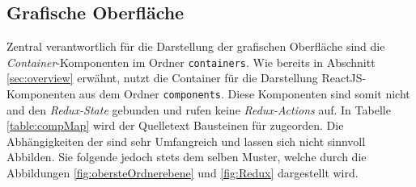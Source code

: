 \subsection{Grafische Oberfläche}

Zentral verantwortlich für die Darstellung der grafischen Oberfläche sind die \emph{Container}-Komponenten im Ordner \lstinline|containers|. Wie bereits in  Abschnitt \ref{sec:overview} erwähnt, nutzt die Container für die Darstellung ReactJS-Komponenten aus dem Ordner \lstinline|components|.
Diese Komponenten sind somit nicht and den \emph{Redux-State} gebunden und rufen keine \emph{Redux-Actions} auf.
In Tabelle \ref{table:compMap} wird der Quelletext Bausteinen für zugeorden. Die Abhängigkeiten der sind sehr Umfangreich und lassen sich nicht sinnvoll Abbilden. Sie
folgende jedoch stets dem selben Muster, welche durch die Abbildungen \ref{fig:obersteOrdnerebene} und \ref{fig:Redux} dargestellt wird.

